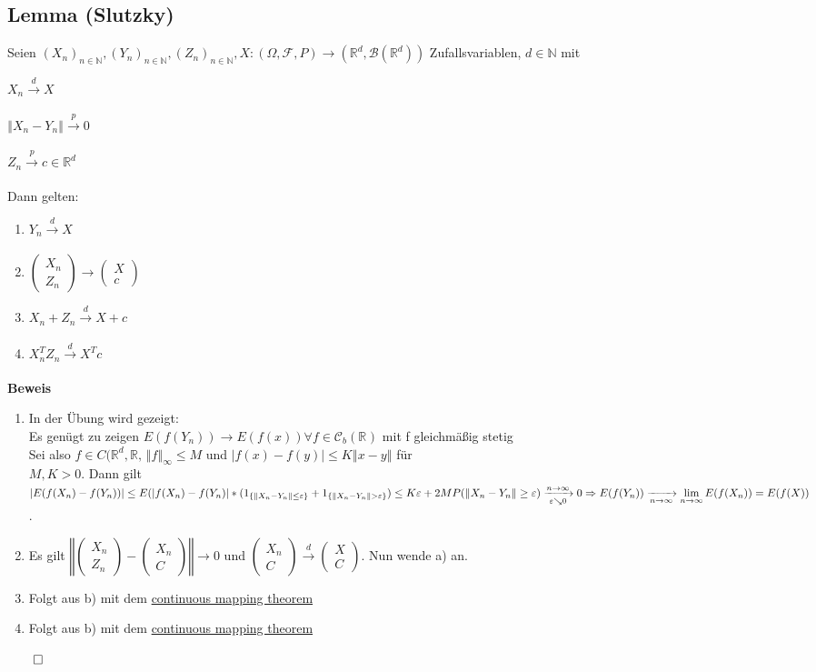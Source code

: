 \documentclass[german,10pt,oneside, fleqn, a4paper]{article}
\newcommand {\R}	{\mathbb{R}}
\newcommand {\N}	{\mathbb{N}}
\newcommand {\C}	{\mathbb{C}}
\newcommand{\Ra}	{\Rightarrow}
\newcommand{\ra}{\rightarrow}
\newcommand{\brc}[1]{\left(#1\right)}
\newcommand{\brac}[1]{\left\lbrace #1\right\rbrace}
\newcommand{\folge}[3][\N]{\left(#2_#3\right)_{#3\in #1}}
\newcommand{\norm}[1]{\left\Vert #1 \right\Vert}
\newcommand{\QED}{\begin{flushright}$\qed$\end{flushright}}
\newcommand{\mat}[1]{\begin{pmatrix}#1\end{pmatrix}}
\newcommand{\mc}[1]{\mathcal{#1}}
\newcommand{\beweis}{\textbf{Beweis}\\}
\newcommand{\toinf}{\rightarrow\infty}
\newcommand{\1}[1]{1_{#1}}
\newcommand{\2}[1]{\1{\brac{#1}}}
\newcommand{\xr}[2][]{\xrightarrow[#1]{#2}}
\newcommand{\cb}[1][d]{\mc{C}_b\brc{\R^{#1}}}
\newcommand{\rbor}[1][d]{\brc{\R^{#1},\mc{B}\brc{\R^{#1}}}}
\newcommand{\raum}{\brc{\Omega,\mc{F},P}}
\begin{document}
\subsection{Lemma (Slutzky)}
\label{3.12}
Seien $\folge{X}{n}, \folge{Y}{n}, \folge{Z}{n}, X:\raum\ra\rbor[d]$ Zufallsvariablen, $d\in\N$ mit\begin{list}{•}{}
\item $X_n\xr{d}X$
\item $\norm{X_n-Y_n}\xr{p}0$
\item $Z_n\xr{p}c\in\R^d$
\end{list}
Dann gelten:\begin{enumerate}[label=(\alph*)]
\item $Y_n\xr{d}X$
\item $\mat{X_n\\Z_n}\ra \mat{X\\c}$
\item $X_n+Z_n\xr{d}X+c$
\item $X_n^TZ_n\xr{d}X^Tc$
\end{enumerate}
\beweis
\begin{enumerate}[label=(\alph*)]
\item In der Übung wird gezeigt:\\
Es genügt zu zeigen $E(f(Y_n))\ra E(f(x))\forall f\in \cb[]$ mit f gleichmäßig stetig\\
Sei also $f\in C(\R^d,\R\text{, }\norm{f}_{\infty}\leq M$
 und $|f(x)-f(y)|\leq K\norm{x-y}$ für\\
 $M,K>0$. Dann gilt\\
$|E(f(X_n)-f(Y_n))|\leq E(|f(X_n)-f(Y_n)|*(\1{\brac{\norm{X_n-Y_n}\\
\leq\varepsilon}}+\1{\brac{\norm{X_n-Y_n}>\varepsilon}})\\
\leq K\varepsilon+2MP(\norm{X_n-Y_n}\geq\varepsilon)\xr[\varepsilon\searrow0]{n\toinf}0\\
\Ra E(f(Y_n))\xr[n\toinf]{}\lim\limits_{n\toinf}E(f(X_n))=E(f(X))$.
\item Es gilt $\norm{\mat{X_n\\Z_n}-\mat{X_n\\C}}\ra 0$ und $\mat{X_n\\C}\xr{d}\mat{X\\C}$. Nun wende a) an.
\item Folgt aus b) mit dem \hyperref[2.6]{continuous mapping theorem}
\item Folgt aus b) mit dem \hyperref[2.6]{continuous mapping theorem}
\end{enumerate}\QED
\end{document}
